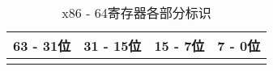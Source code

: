 \begin{table}[H]
    \captionsetup{skip=4pt}
    \centering
    \setlength{\arrayrulewidth}{1pt}
    \begin{tabular}{cccc}
        \hline
        63 - 31位 & 31 - 15位 & 15 - 7位 & 7 - 0位 \\
        \hline
        \texttt{%
        \texttt{%
        \texttt{%
        \texttt{%
        \texttt{%
        \texttt{%
        \texttt{%
        \texttt{%
        \texttt{%
        \texttt{%
        \texttt{%
        \texttt{%
        \texttt{%
        \texttt{%
        \texttt{%
        \texttt{%
        \hline
    \end{tabular}
    \caption{x86 - 64寄存器各部分标识}
\end{table}
